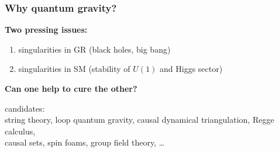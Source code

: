 \documentclass[]{beamer}  %
\begin{document}
\addtocounter{framenumber}{-1}
\begin{frame}
  \frametitle{Why quantum gravity?}

  \vspace{10pt}

  \textbf{Two pressing issues:}
  \begin{enumerate}
    \item singularities in GR (black holes, big bang)
      \hspace{2cm}
    \item singularities in SM (stability of $U(1)$ and Higgs sector)
  \end{enumerate}
  \vfill
  \begin{center}
    \fontsize{12pt}{7.2}\selectfont
    \textbf{ Can one help to cure the other? }
  \end{center}
  \pause
  \vspace{-15pt}
  \begin{center}
    candidates:\\[3pt]
    string theory, loop quantum gravity, causal dynamical triangulation, Regge calculus,\\
    causal sets, spin foams, group field theory, \dots
  \end{center}
\end{frame}
\end{document}
